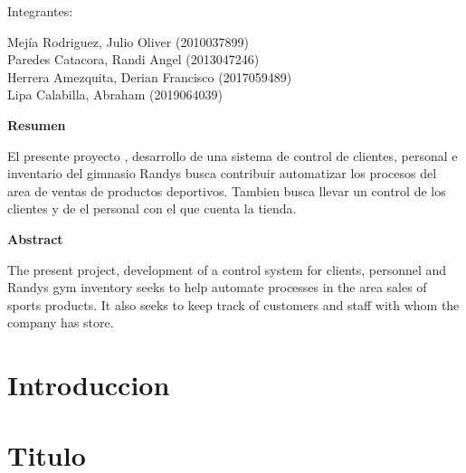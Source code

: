 \documentclass[12pt,letterpaper]{article}
\begin{document}
\begin{titlepage}
\begin{center}
\vspace*{0.2in}
\vspace*{0.1in}
\begin{large}
Integrantes: \\
\begin{flushleft}

Mej\'ia Rodriguez, Julio Oliver         	\hfill	(2010037899) \\
Paredes Catacora, Randi Angel   	\hfill	(2013047246) \\
Herrera Amezquita, Derian Francisco		\hfill	(2017059489) \\
Lipa Calabilla, Abraham		\hfill	(2019064039) \\

\end{flushleft}
\end{large}
\end{center}

\end{titlepage}



\tableofcontents %
\thispagestyle{empty} %
\newpage
\setcounter{page}{1} %


\begin{center}
    \textbf{\Large Resumen}  
\end{center}

El presente proyecto , desarrollo de una sistema de control de clientes, personal e
inventario del gimnasio Randys busca  contribuir automatizar los procesos del area 
de ventas de productos deportivos.
Tambien busca llevar un control de los clientes y de el personal con el que cuenta la 
tienda. 
\\
\begin{center}
    \textbf{\Large Abstract}
\end{center}

The present project, development of a control system for clients, personnel and
Randys gym inventory seeks to help automate processes in the area
sales of sports products.
It also seeks to keep track of customers and staff with whom the company has
store.

\section{Introduccion} 

\section{Titulo} 
\end{document}
